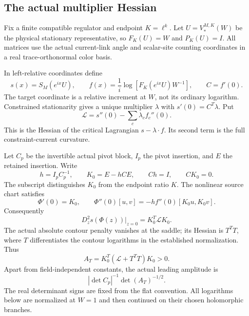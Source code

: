 \documentclass[11pt]{article}
\theoremstyle{remark}
\begin{document}
\subsection{The actual multiplier Hessian}
\label{dgb-setup-section}

Fix a finite compatible regulator and endpoint $K=\ell^k$.
Let $U=V_*^{M,K}(W)$ be the physical stationary representative,
so $F_K(U)=W$ and $P_K(U)=I$. All matrices use the actual
current-link angle and scalar-site counting coordinates in a real
trace-orthonormal color basis.

In left-relative coordinates define
\begin{equation}
 s(x)=S_M(e^{ix}U),\qquad
 f(x)=\frac1i\log\!\left[F_K(e^{ix}U)W^{-1}\right],
 \qquad C=f'(0).
 \label{dgb-relative-coordinates}
\end{equation}
The target coordinate is a relative increment at $W$, not its
ordinary logarithm. Constrained stationarity gives a unique
multiplier $\lambda$ with $s'(0)=C^T\lambda$. Put
\begin{equation}
 \mathcal L=s''(0)-\sum_c\lambda_c f_c''(0).
 \label{dgb-Lagrangian}
\end{equation}
This is the Hessian of the critical Lagrangian
$s-\lambda\cdot f$. Its second term is the full
constraint-current curvature.

Let $C_p$ be the invertible actual pivot block, $I_p$ the pivot
insertion, and $E$ the retained insertion. Write
\begin{equation}
 h=I_pC_p^{-1},\qquad K_0=E-hCE,\qquad
 Ch=I,\qquad CK_0=0.
 \label{dgb-chart-linear}
\end{equation}
The subscript distinguishes $K_0$ from the endpoint ratio $K$.
The nonlinear source chart satisfies
\begin{equation}
 \Phi'(0)=K_0,\qquad
 \Phi''(0)[u,v]=-h f''(0)[K_0u,K_0v].
 \label{dgb-chart-curvature}
\end{equation}
Consequently
\[
 D_z^2s(\Phi(z))\big|_{z=0}=K_0^T\mathcal L K_0 .
\]
The actual absolute contour penalty vanishes at the saddle;
its Hessian is $T^TT$, where $T$ differentiates the contour
logarithms in the established normalization. Thus
\begin{equation}
 A_T=K_0^T(\mathcal L+T^TT)K_0>0.
 \label{dgb-actual-precision}
\end{equation}
Apart from field-independent constants, the actual leading
amplitude is
\begin{equation}
                  |\det C_p|^{-1}\det(A_T)^{-1/2}.
 \label{dgb-actual-amplitude}
\end{equation}
The real determinant signs are fixed from the flat convention.
All logarithms below are normalized at $W=1$ and then continued
on their chosen holomorphic branches.
\end{document}
